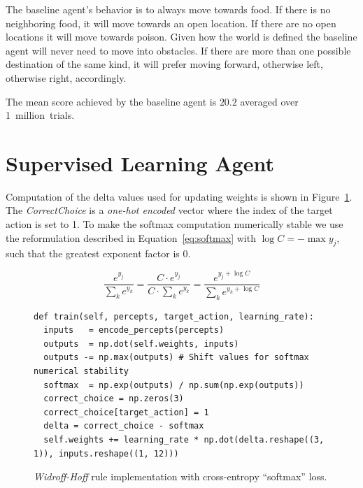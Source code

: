 \documentclass[paper=a4, fontsize=10pt]{scrartcl}
\begin{document}
The baseline agent's behavior is to always move towards food. If there is no neighboring food, it will move towards an open location. If there are no open locations it will move towards poison. Given how the world is defined the baseline agent will never need to move into obstacles. If there are more than one possible destination of the same kind, it will prefer moving forward, otherwise left, otherwise right, accordingly.

The mean score achieved by the baseline agent is $20.2$ averaged over 1~million~trials.

\section*{Supervised Learning Agent}

Computation of the delta values used for updating weights is shown in Figure~\ref{fig:code_delta_supervised}. The \textit{CorrectChoice} is a \textit{one-hot encoded} vector where the index of the target action is set to 1. To make the softmax computation numerically stable we use the reformulation described in Equation~\ref{eq:softmax} with $\log C = -\max y_j$, such that the greatest exponent factor is 0.

\begin{equation}
\frac{e^{y_j}}{\sum_k e^{y_k}} = \frac{C \cdot e^{y_j}}{C \cdot \sum_k e^{y_k}} = \frac{e^{y_j + \log C}}{\sum_k e^{y_k + \log C}}
\label{eq:softmax}
\end{equation}


\begin{figure}[H]
\footnotesize
\begin{verbatim}
def train(self, percepts, target_action, learning_rate):
  inputs   = encode_percepts(percepts)
  outputs  = np.dot(self.weights, inputs)
  outputs -= np.max(outputs) # Shift values for softmax numerical stability
  softmax  = np.exp(outputs) / np.sum(np.exp(outputs))
  correct_choice = np.zeros(3)
  correct_choice[target_action] = 1 
  delta = correct_choice - softmax
  self.weights += learning_rate * np.dot(delta.reshape((3, 1)), inputs.reshape((1, 12)))
\end{verbatim}
\vspace*{-5mm}
\caption{\textit{Widroff-Hoff} rule implementation with cross-entropy ``softmax'' loss.}
\label{fig:code_delta_supervised}
\end{figure}
\end{document}
